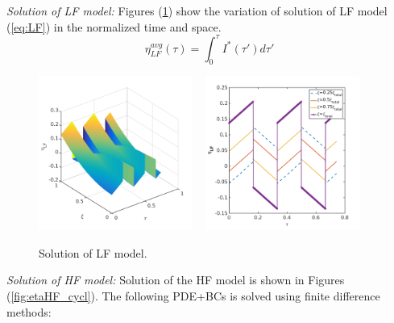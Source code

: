\documentclass[]{article}
\begin{document}
\textit{Solution of LF model:}
Figures (\ref{fig:etaLF_cycl}) show the variation of solution of LF model (\ref{eq:LF}) in the normalized time and space. %
%
\begin{equation}\label{eq:Iprim}
{\eta_{LF}^{avg}}(\tau) = \int_0^{\tau} I^*(\tau') d\tau' 
\end{equation}
\begin{figure}[h]
    \centering
    \includegraphics[trim = 0in 0in 0in 0in, clip, width=0.45\textwidth]{figures/cyclic_new/etaLF3d.png}
    ~
    \includegraphics[trim = 0in 0in 0in 0in, clip, width=0.45\textwidth]{figures/cyclic_new/etaLF_t.png} 
    \vspace{-0.2in}     
    \caption{Solution of LF model.}
    \label{fig:etaLF_cycl}
\end{figure}
%
\textit{Solution of HF model:}
Solution of the HF model is shown in Figures (\ref{fig:etaHF_cycl}). The following PDE+BCs is solved using finite difference methods:
\end{document}

